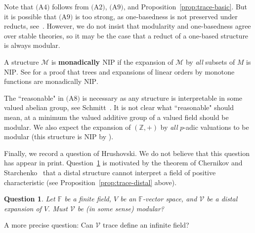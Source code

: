 \documentclass[bibalpha]{amsart}
\newtheorem{qst}[theorem]{Question}
\newtheorem{conj}{Conjecture}
\theoremstyle{definition}
\theoremstyle{remark}
\newcommand{\ksh}{K^{\mathrm{Sh}}}
\newcommand{\nip}{\mathrm{NIP}}
\newcommand{\Sa}[1]{\ensuremath{\mathscr{#1}}}
\newcommand{\Z}{\mathbb{Z}}
\newcommand{\F}{\mathbb{F}}
\begin{document}
\noindent
Note that $($A$4)$ follows from $($A$2)$, $($A$9)$, and Proposition~\ref{prop:trace-basic}.
But it is possible that $($A$9)$ is too strong, as one-basedness is not preserved under reducts, see~\cite{Evans2005}.
However, we do not insist that modularity and one-basedness agree over stable theories, so it may be the case that a reduct of a one-based structure is always modular.
\newline

\noindent
A structure $\Sa M$ is \textbf{monadically $\nip$} if the expansion of $\Sa M$ by \textit{all} subsets of $M$ is $\nip$.
See \cite{Simon-dp} for a proof that trees and expansions of linear orders by monotone functions are monadically $\nip$.
\newline

\noindent
The ``reasonable" in $($A$8)$ is necessary as any structure is interpretable in some valued abelian group, see Schmitt~\cite{Schmitt1984}.
It is not clear what ``reasonable" should mean, at a minimum the valued additive group of a valued field should be modular.
We also expect the expansion of $(\Z,+)$ by \textit{all} $p$-adic valuations to be modular (this structure is $\nip$ by \cite{AldE}).
\newline



\noindent
Finally, we record a question of Hrushovski.
We do not believe that this question has appear in print.
Question~\ref{ques:hrush} is motivated by the theorem of Chernikov and Starchenko~\cite{CS} that a distal structure cannot interpret a field of positive characteristic (see Proposition~\ref{prop:trace-distal} above).

\begin{qst}
\label{ques:hrush}
Let $\F$ be a finite field, $V$ be an $\F$-vector space, and $\Sa V$ be a distal expansion of $V$.
Must $\Sa V$ be (in some sense) modular?
\end{qst}

\noindent
A more precise question: Can $\Sa V$ trace define an infinite field? 
\newpage



\end{document}

